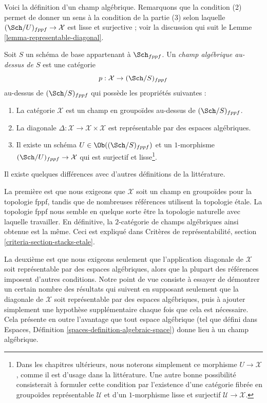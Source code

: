 \noindent
Voici la définition d'un champ algébrique. Remarquons que la condition
(2) permet de donner un sens à la condition de la partie (3) selon laquelle
$(\Sch/U)_{fppf} \to \mathcal{X}$
est lisse et surjective ; voir la discussion qui suit le
Lemme \ref{lemma-representable-diagonal}.

\begin{definition}
\label{definition-algebraic-stack}
Soit $S$ un schéma de base appartenant à $\Sch_{fppf}$.
Un {\it champ algébrique au-dessus de $S$} est une catégorie
$$
p : \mathcal{X} \to (\Sch/S)_{fppf}
$$
au-dessus de $(\Sch/S)_{fppf}$ qui possède les propriétés suivantes :
\begin{enumerate}
\item La catégorie $\mathcal{X}$ est un champ en groupoïdes au-dessus de
$(\Sch/S)_{fppf}$.
\item La diagonale
$\Delta : \mathcal{X} \to \mathcal{X} \times \mathcal{X}$
est représentable par des espaces algébriques.
\item Il existe un schéma $U \in \Ob((\Sch/S)_{fppf})$
et un $1$-morphisme $(\Sch/U)_{fppf} \to \mathcal{X}$
qui est surjectif et lisse\footnote{Dans les chapitres ultérieurs, nous noterons
simplement ce morphisme $U \to \mathcal{X}$, comme il est d'usage dans la littérature. Une autre
bonne possibilité consisterait à formuler cette condition par l'existence d'une
catégorie fibrée en groupoïdes représentable $\mathcal{U}$ et d'un $1$-morphisme
lisse et surjectif $\mathcal{U} \to \mathcal{X}$.}.
\end{enumerate}
\end{definition}

\noindent
Il existe quelques différences avec d'autres définitions de la littérature.

\medskip\noindent
La première est que nous exigeons que $\mathcal{X}$ soit un champ en groupoïdes
pour la topologie fppf, tandis que de nombreuses références utilisent la topologie \'etale.
La topologie fppf nous semble en quelque sorte être la topologie naturelle
avec laquelle travailler. En définitive, la $2$-catégorie de champs algébriques
ainsi obtenue est la même. Ceci est expliqué dans
Critères de représentabilité, section \ref{criteria-section-stacks-etale}.

\medskip\noindent
La deuxième est que nous exigeons seulement que l'application diagonale de $\mathcal{X}$ soit
représentable par des espaces algébriques, alors que la plupart des références imposent d'autres
conditions. Notre point de vue consiste à essayer de démontrer un certain
nombre des résultats qui suivent en supposant seulement que la diagonale
de $\mathcal{X}$ soit représentable par des espaces algébriques, puis à ajouter simplement
une hypothèse supplémentaire chaque fois que cela est nécessaire. Cela présente en outre
l'avantage que tout espace algébrique (tel que défini dans
Espaces, Définition \ref{spaces-definition-algebraic-space})
donne lieu à un champ algébrique.

